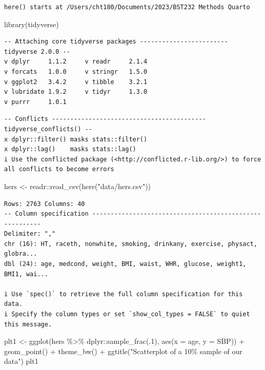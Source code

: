\documentclass[
  letterpaper,
  DIV=11,
  numbers=noendperiod]{scrreport}
\newenvironment{Shaded}{\begin{snugshade}}{\end{snugshade}}
\newcommand{\AttributeTok}[1]{\textcolor[rgb]{0.40,0.45,0.13}{#1}}
\newcommand{\DecValTok}[1]{\textcolor[rgb]{0.68,0.00,0.00}{#1}}
\newcommand{\FunctionTok}[1]{\textcolor[rgb]{0.28,0.35,0.67}{#1}}
\newcommand{\NormalTok}[1]{\textcolor[rgb]{0.00,0.23,0.31}{#1}}
\newcommand{\OtherTok}[1]{\textcolor[rgb]{0.00,0.23,0.31}{#1}}
\newcommand{\SpecialCharTok}[1]{\textcolor[rgb]{0.37,0.37,0.37}{#1}}
\newcommand{\StringTok}[1]{\textcolor[rgb]{0.13,0.47,0.30}{#1}}
\begin{document}
\begin{verbatim}
here() starts at /Users/cht180/Documents/2023/BST232 Methods Quarto
\end{verbatim}

\begin{Shaded}
\begin{Highlighting}[]
\FunctionTok{library}\NormalTok{(tidyverse)}
\end{Highlighting}
\end{Shaded}

\begin{verbatim}
-- Attaching core tidyverse packages ------------------------ tidyverse 2.0.0 --
v dplyr     1.1.2     v readr     2.1.4
v forcats   1.0.0     v stringr   1.5.0
v ggplot2   3.4.2     v tibble    3.2.1
v lubridate 1.9.2     v tidyr     1.3.0
v purrr     1.0.1     
\end{verbatim}

\begin{verbatim}
-- Conflicts ------------------------------------------ tidyverse_conflicts() --
x dplyr::filter() masks stats::filter()
x dplyr::lag()    masks stats::lag()
i Use the conflicted package (<http://conflicted.r-lib.org/>) to force all conflicts to become errors
\end{verbatim}

\begin{Shaded}
\begin{Highlighting}[]
\NormalTok{hers }\OtherTok{\textless{}{-}}\NormalTok{ readr}\SpecialCharTok{::}\FunctionTok{read\_csv}\NormalTok{(}\FunctionTok{here}\NormalTok{(}\StringTok{"data/hers.csv"}\NormalTok{))}
\end{Highlighting}
\end{Shaded}

\begin{verbatim}
Rows: 2763 Columns: 40
-- Column specification --------------------------------------------------------
Delimiter: ","
chr (16): HT, raceth, nonwhite, smoking, drinkany, exercise, physact, globra...
dbl (24): age, medcond, weight, BMI, waist, WHR, glucose, weight1, BMI1, wai...

i Use `spec()` to retrieve the full column specification for this data.
i Specify the column types or set `show_col_types = FALSE` to quiet this message.
\end{verbatim}

\begin{Shaded}
\begin{Highlighting}[]
\NormalTok{plt1 }\OtherTok{\textless{}{-}} \FunctionTok{ggplot}\NormalTok{(hers }\SpecialCharTok{\%\textgreater{}\%}\NormalTok{ dplyr}\SpecialCharTok{::}\FunctionTok{sample\_frac}\NormalTok{(.}\DecValTok{1}\NormalTok{), }\FunctionTok{aes}\NormalTok{(}\AttributeTok{x =}\NormalTok{ age, }\AttributeTok{y =}\NormalTok{ SBP)) }\SpecialCharTok{+} 
  \FunctionTok{geom\_point}\NormalTok{() }\SpecialCharTok{+} 
  \FunctionTok{theme\_bw}\NormalTok{() }\SpecialCharTok{+} 
  \FunctionTok{ggtitle}\NormalTok{(}\StringTok{"Scatterplot of a 10\% sample of our data"}\NormalTok{) }
\NormalTok{plt1 }
\end{Highlighting}
\end{Shaded}
\end{document}
